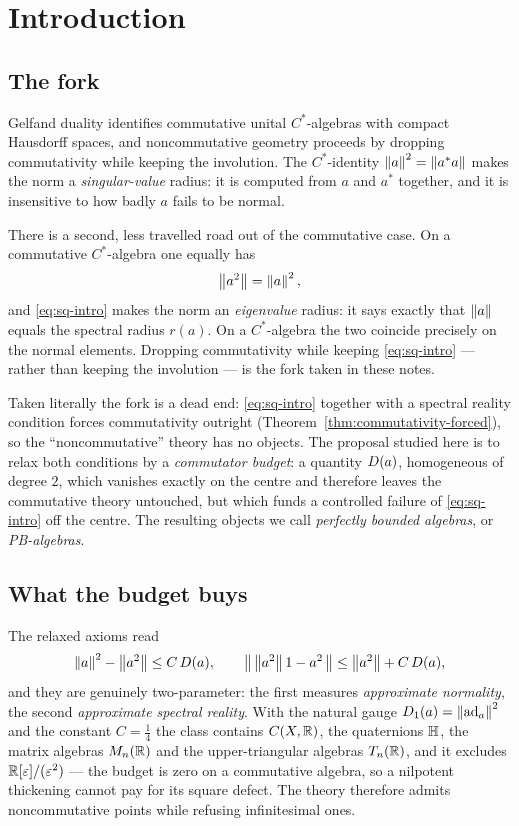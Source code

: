 \section{Introduction}
\label{sec:intro}

\subsection{The fork}

Gelfand duality identifies commutative unital $C^*$-algebras with compact
Hausdorff spaces, and noncommutative geometry proceeds by dropping
commutativity while keeping the involution.  The $C^*$-identity
$\left\lVert a\right\rVert^2=\left\lVert a^*a\right\rVert$ makes the norm a \emph{singular-value} radius: it is
computed from $a$ and $a^*$ together, and it is insensitive to how badly $a$
fails to be normal.

There is a second, less travelled road out of the commutative case.  On a
commutative $C^*$-algebra one equally has
\begin{equation}
  \left\lVert a^2\right\rVert=\left\lVert a\right\rVert^2,
  \label{eq:sq-intro}
\end{equation}
and \eqref{eq:sq-intro} makes the norm an \emph{eigenvalue} radius: it says
exactly that $\left\lVert a\right\rVert$ equals the spectral radius $r(a)$.  On a $C^*$-algebra
the two coincide precisely on the normal elements.  Dropping commutativity while
keeping \eqref{eq:sq-intro} --- rather than keeping the involution --- is the
fork taken in these notes.

Taken literally the fork is a dead end: \eqref{eq:sq-intro} together with a
spectral reality condition forces commutativity outright
(Theorem~\ref{thm:commutativity-forced}), so the ``noncommutative'' theory has
no objects.  The proposal studied here is to relax both conditions by a
\emph{commutator budget}: a quantity $D(a)$, homogeneous of degree $2$,
which vanishes exactly on the centre and therefore leaves the commutative theory
untouched, but which funds a controlled failure of \eqref{eq:sq-intro} off the
centre.  The resulting objects we call \emph{perfectly bounded algebras}, or
\emph{PB-algebras}.

\subsection{What the budget buys}

The relaxed axioms read
\[
  \left\lVert a\right\rVert^2-\left\lVert a^2\right\rVert\le C\,D(a),
  \qquad
  \bigl\lVert\,\left\lVert a^2\right\rVert1-a^2\,\bigr\rVert\le\left\lVert a^2\right\rVert+C\,D(a),
\]
and they are genuinely two-parameter: the first measures \emph{approximate
normality}, the second \emph{approximate spectral reality}.  With the natural
gauge $D_1(a)=\left\lVert\operatorname{ad}_a\right\rVert^2$ and the constant $C=\tfrac14$ the class
contains $C(X,\mathbb{R})$, the quaternions $\mathbb{H}$, the matrix algebras $M_n(\mathbb{R})$ and
the upper-triangular algebras $T_n(\mathbb{R})$, and it excludes
$\mathbb{R}[\varepsilon]/(\varepsilon^2)$ --- the budget is zero on a commutative
algebra, so a nilpotent thickening cannot pay for its square defect.  The
theory therefore admits noncommutative points while refusing infinitesimal ones.

